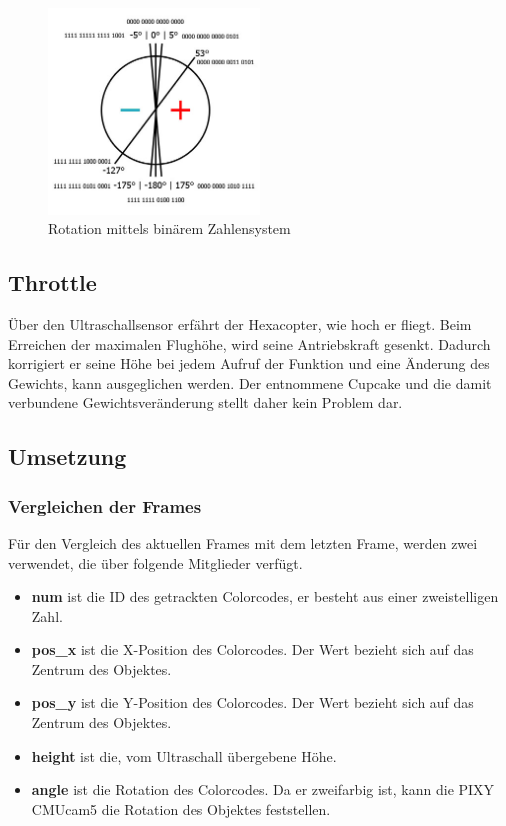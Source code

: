     \begin{figure}[H]
      \begin{centering}
        \includegraphics[width = 0.5\textwidth]{Bilder/bor_rot_beschr2}
      \par\end{centering}
      \caption{Rotation mittels binärem Zahlensystem}
      \label{Rotation_Beschreibung}
    \end{figure}

    \subsection*{Throttle}
    Über den Ultraschallsensor erfährt der Hexacopter, wie hoch er fliegt. Beim Erreichen der maximalen Flughöhe, wird seine Antriebskraft gesenkt. Dadurch korrigiert er seine Höhe bei jedem Aufruf der Funktion und eine Änderung des Gewichts, kann ausgeglichen werden. Der entnommene Cupcake und die damit verbundene Gewichtsveränderung stellt daher kein Problem dar.

  \subsection{Umsetzung}

    \subsubsection{Vergleichen der Frames}
    Für den Vergleich des aktuellen Frames mit dem letzten Frame, werden zwei  verwendet, die über folgende Mitglieder verfügt. \cite{Structs}
    \begin{itemize}
      \item \textbf{num} ist die ID des getrackten Colorcodes, er besteht aus einer zweistelligen Zahl.
      \item \textbf{pos\_x} ist die X-Position des Colorcodes. Der Wert bezieht sich auf das Zentrum des Objektes.
      \item \textbf{pos\_y} ist die Y-Position des Colorcodes. Der Wert bezieht sich auf das Zentrum des Objektes.
      \item \textbf{height} ist die, vom Ultraschall übergebene Höhe.
      \item \textbf{angle} ist die Rotation des Colorcodes. Da er zweifarbig ist, kann die PIXY CMUcam5 die Rotation des Objektes feststellen.
    \end{itemize}

